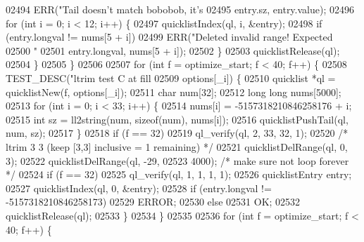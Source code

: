 \begin{DoxyCode}
{{{{{{{{{{{{{{{{{{{{{{{{{{{{{{{{{{{{{{{{{{{{{{{{{{{{{{{{{{{{{{{{{{{{{{{{{{{{{{{{{{{{{{{{{{{{{{{{02494                     ERR(\textcolor{stringliteral}{"Tail doesn't match bobobob, it's %
02495                         entry.sz, entry.value);
02496                 \textcolor{keywordflow}{for} (\textcolor{keywordtype}{int} i = 0; i < 12; i++) \{
02497                     quicklistIndex(ql, i, &entry);
02498                     \textcolor{keywordflow}{if} (entry.longval != nums[5 + i])
02499                         ERR(\textcolor{stringliteral}{"Deleted invalid range!  Expected %
02500                             \textcolor{stringliteral}{"%
02501                             entry.longval, nums[5 + i]);
02502                 \}
02503                 quicklistRelease(ql);
02504             \}
02505         \}
02506 
02507         \textcolor{keywordflow}{for} (\textcolor{keywordtype}{int} f = optimize\_start; f < 40; f++) \{
02508             TEST\_DESC(\textcolor{stringliteral}{"ltrim test C at fill %
02509                       options[\_i]) \{
02510                 quicklist *ql = quicklistNew(f, options[\_i]);
02511                 \textcolor{keywordtype}{char} num[32];
02512                 \textcolor{keywordtype}{long} \textcolor{keywordtype}{long} nums[5000];
02513                 \textcolor{keywordflow}{for} (\textcolor{keywordtype}{int} i = 0; i < 33; i++) \{
02514                     nums[i] = -5157318210846258176 + i;
02515                     \textcolor{keywordtype}{int} sz = ll2string(num, \textcolor{keyword}{sizeof}(num), nums[i]);
02516                     quicklistPushTail(ql, num, sz);
02517                 \}
02518                 \textcolor{keywordflow}{if} (f == 32)
02519                     ql\_verify(ql, 2, 33, 32, 1);
02520                 \textcolor{comment}{/* ltrim 3 3 (keep [3,3] inclusive = 1 remaining) */}
02521                 quicklistDelRange(ql, 0, 3);
02522                 quicklistDelRange(ql, -29,
02523                                   4000); \textcolor{comment}{/* make sure not loop forever */}
02524                 \textcolor{keywordflow}{if} (f == 32)
02525                     ql\_verify(ql, 1, 1, 1, 1);
02526                 quicklistEntry entry;
02527                 quicklistIndex(ql, 0, &entry);
02528                 \textcolor{keywordflow}{if} (entry.longval != -5157318210846258173)
02529                     ERROR;
02530                 \textcolor{keywordflow}{else}
02531                     OK;
02532                 quicklistRelease(ql);
02533             \}
02534         \}
02535 
02536         \textcolor{keywordflow}{for} (\textcolor{keywordtype}{int} f = optimize\_start; f < 40; f++) \{
}}}}}}}}}}}}}}}}}}}}}}}}}}}}}}}}}}}}}}}}}}}}}}}}}}}}}}}}}}}}}}}}}}}}}}}}}}}}}}}}}}}}}}}}}}}}}}}}}}}}
\end{DoxyCode}
